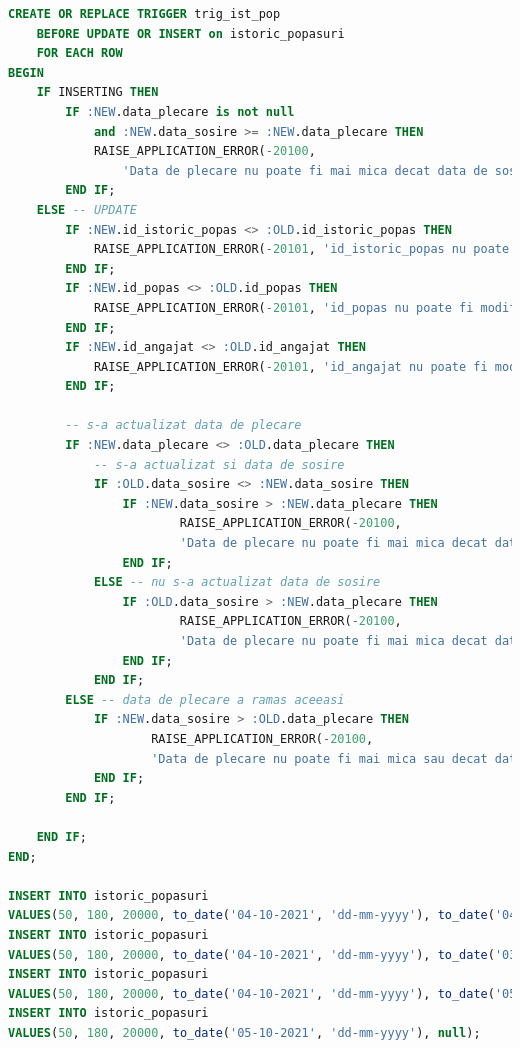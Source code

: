 \documentclass[12pt, a4paper]{article}
\begin{document}
\begin{lstlisting}[language=SQL]
CREATE OR REPLACE TRIGGER trig_ist_pop
    BEFORE UPDATE OR INSERT on istoric_popasuri
    FOR EACH ROW
BEGIN
    IF INSERTING THEN
        IF :NEW.data_plecare is not null 
            and :NEW.data_sosire >= :NEW.data_plecare THEN
            RAISE_APPLICATION_ERROR(-20100, 
                'Data de plecare nu poate fi mai mica decat data de sosire');
        END IF;
    ELSE -- UPDATE
        IF :NEW.id_istoric_popas <> :OLD.id_istoric_popas THEN
            RAISE_APPLICATION_ERROR(-20101, 'id_istoric_popas nu poate fi modificat.');
        END IF;
        IF :NEW.id_popas <> :OLD.id_popas THEN
            RAISE_APPLICATION_ERROR(-20101, 'id_popas nu poate fi modificat.');
        END IF;
        IF :NEW.id_angajat <> :OLD.id_angajat THEN
            RAISE_APPLICATION_ERROR(-20101, 'id_angajat nu poate fi modificat.');
        END IF;
        
        -- s-a actualizat data de plecare
        IF :NEW.data_plecare <> :OLD.data_plecare THEN
            -- s-a actualizat si data de sosire
            IF :OLD.data_sosire <> :NEW.data_sosire THEN
                IF :NEW.data_sosire > :NEW.data_plecare THEN
                        RAISE_APPLICATION_ERROR(-20100, 
                        'Data de plecare nu poate fi mai mica decat data de sosire');
                END IF;
            ELSE -- nu s-a actualizat data de sosire
                IF :OLD.data_sosire > :NEW.data_plecare THEN
                        RAISE_APPLICATION_ERROR(-20100, 
                        'Data de plecare nu poate fi mai mica decat data de sosire');
                END IF;
            END IF;
        ELSE -- data de plecare a ramas aceeasi
            IF :NEW.data_sosire > :OLD.data_plecare THEN
                    RAISE_APPLICATION_ERROR(-20100, 
                    'Data de plecare nu poate fi mai mica sau decat data de sosire');
            END IF;
        END IF;
        
    END IF;
END;

INSERT INTO istoric_popasuri
VALUES(50, 180, 20000, to_date('04-10-2021', 'dd-mm-yyyy'), to_date('04-10-2021', 'dd-mm-yyyy'));
INSERT INTO istoric_popasuri
VALUES(50, 180, 20000, to_date('04-10-2021', 'dd-mm-yyyy'), to_date('03-10-2021', 'dd-mm-yyyy'));
INSERT INTO istoric_popasuri
VALUES(50, 180, 20000, to_date('04-10-2021', 'dd-mm-yyyy'), to_date('05-10-2021', 'dd-mm-yyyy'));
INSERT INTO istoric_popasuri
VALUES(50, 180, 20000, to_date('05-10-2021', 'dd-mm-yyyy'), null);


\end{lstlisting}
\end{document}
